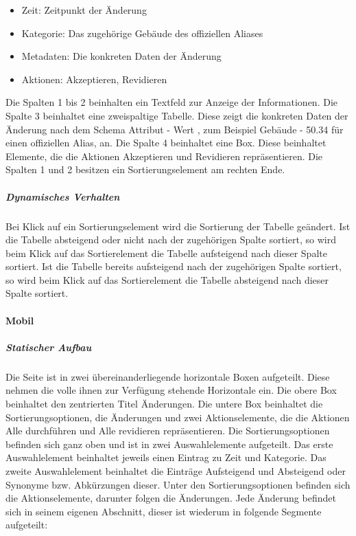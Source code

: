\begin{itemize}
    \item Zeit: Zeitpunkt der Änderung
    \item Kategorie: Das zugehörige Gebäude des offiziellen Aliases
    \item Metadaten: Die konkreten Daten der Änderung
    \item Aktionen: Akzeptieren, Revidieren
\end{itemize}

Die Spalten 1 bis 2 beinhalten ein Textfeld zur Anzeige der Informationen.
Die Spalte 3 beinhaltet eine zweispaltige Tabelle. Diese zeigt die konkreten Daten der Änderung nach dem Schema \dq Attribut - Wert \dq{}, zum Beispiel \dq Gebäude - 50.34 \dq{} für einen offiziellen Alias, an.
Die Spalte 4 beinhaltet eine Box. Diese beinhaltet Elemente, die die Aktionen \dq Akzeptieren \dq{} und \dq Revidieren \dq{} repräsentieren.
Die Spalten 1 und 2 besitzen ein Sortierungselement am rechten Ende.

\subparagraph*{Dynamisches Verhalten}
Bei Klick auf ein Sortierungselement wird die Sortierung der Tabelle geändert.
Ist die Tabelle absteigend oder nicht nach der zugehörigen Spalte sortiert, so wird beim Klick auf das Sortierelement die Tabelle aufsteigend nach dieser Spalte sortiert.
Ist die Tabelle bereits aufsteigend nach der zugehörigen Spalte sortiert, so wird beim Klick auf das Sortierelement die Tabelle absteigend nach dieser Spalte sortiert.

\paragraph*{Mobil}
\subparagraph*{Statischer Aufbau}
Die Seite ist in zwei übereinanderliegende horizontale Boxen aufgeteilt. Diese nehmen die volle ihnen zur Verfügung stehende Horizontale ein.
Die obere Box beinhaltet den zentrierten Titel \dq Änderungen\dq.
Die untere Box beinhaltet die Sortierungsoptionen, die Änderungen und zwei Aktionselemente, die die Aktionen \dq Alle durchführen\dq{} und \dq Alle revidieren\dq{} repräsentieren.
Die Sortierungsoptionen befinden sich ganz oben und ist in zwei Auswahlelemente aufgeteilt. 
Das erste Auswahlelement beinhaltet jeweils einen Eintrag zu Zeit und Kategorie.
Das zweite Auswahlelement beinhaltet die Einträge \dq Aufsteigend \dq{} und \dq Absteigend \dq{} oder Synonyme bzw. Abkürzungen dieser.
Unter den Sortierungsoptionen befinden sich die Aktionselemente, darunter folgen die Änderungen.
Jede Änderung befindet sich in seinem eigenen Abschnitt, dieser ist wiederum in folgende Segmente aufgeteilt:

